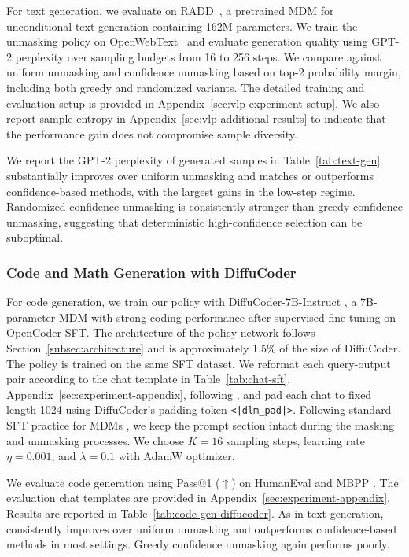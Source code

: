 For text generation, we evaluate \alg{} on RADD~\citep{ou2025absorbingdiscretediffusionsecretly}, a pretrained MDM for unconditional text generation containing 162M parameters. We train the unmasking policy on OpenWebText~\citep{Gokaslan2019OpenWeb} and evaluate generation quality using GPT-2 perplexity over sampling budgets from 16 to 256 steps. We compare against uniform unmasking and confidence unmasking based on top-2 probability margin, including both greedy and randomized variants. The detailed training and evaluation setup is provided in Appendix~\ref{sec:vlp-experiment-setup}. We also report sample entropy in Appendix~\ref{sec:vlp-additional-results} to indicate that the performance gain does not compromise sample diversity.

We report the GPT-2 perplexity of generated samples in Table~\ref{tab:text-gen}. \alg{} substantially improves over uniform unmasking and matches or outperforms confidence-based methods, with the largest gains in the low-step regime. Randomized confidence unmasking is consistently stronger than greedy confidence unmasking, suggesting that deterministic high-confidence selection can be suboptimal.

\iffalse
\subsubsection{Code and Math Generation with DiffuCoder}
For code generation, we train our policy with DiffuCoder-7B-Instruct \citep{gong2025diffucoderunderstandingimprovingmasked}, a 7B-parameter MDM with strong coding performance after supervised fine-tuning on OpenCoder-SFT. The architecture of the policy network follows Section~\ref{subsec:architecture} and is approximately 1.5\% of the size of DiffuCoder. The policy is trained on the same SFT dataset. We reformat each query-output pair according to the chat template in Table~\ref{tab:chat-sft}, Appendix~\ref{sec:experiment-appendix}, following \citet{gong2025diffucoderunderstandingimprovingmasked}, and pad each chat to fixed length 1024 using DiffuCoder's padding token \texttt{<|dlm\_pad|>}. Following standard SFT practice for MDMs \citep{ye2025dream7bdiffusionlarge,nie2025largelanguagediffusionmodels,gong2025diffucoderunderstandingimprovingmasked}, we keep the prompt section intact during the masking and unmasking processes. We choose $K=16$ sampling steps, learning rate $\eta=0.001$, and $\lambda=0.1$ with AdamW optimizer.

We evaluate code generation using Pass@1 ($\uparrow$) on HumanEval \citep{chen2021evaluatinglargelanguagemodels} and MBPP \citep{austin2021programsynthesislargelanguage}. The evaluation chat templates are provided in Appendix~\ref{sec:experiment-appendix}. Results are reported in Table~\ref{tab:code-gen-diffucoder}. As in text generation, \alg{} consistently improves over uniform unmasking and outperforms confidence-based methods in most settings. Greedy confidence unmasking again performs poorly.

